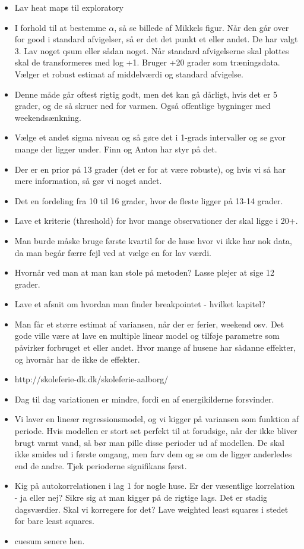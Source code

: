 \begin{itemize}
    \item Lav heat maps til exploratory
    \item I forhold til at bestemme $\alpha$, så se billede af Mikkels figur. Når den går over for good i standard afvigelser, så er det det punkt et eller andet. De har valgt 3. Lav noget qsum eller sådan noget. Når standard afvigelserne skal plottes skal de transformeres med log +1. Bruger +20 grader som træningsdata. Vælger et robust estimat af middelværdi og standard afvigelse. 
    \item Denne måde går oftest rigtig godt, men det kan gå dårligt, hvis det er 5 grader, og de så skruer ned for varmen. Også offentlige bygninger med weekendsænkning. 
    \item Vælge et andet sigma niveau og så gøre det i 1-grads intervaller og se gvor mange der ligger under. Finn og Anton har styr på det. 
    \item Der er en prior på 13 grader (det er for at være robuste), og hvis vi så har mere information, så gør vi noget andet. 
    \item Det en fordeling fra 10 til 16 grader, hvor de fleste ligger på 13-14 grader. 
    \item Lave et kriterie (threshold) for hvor mange observationer der skal ligge i 20+.  
    \item Man burde måske bruge første kvartil for de huse hvor vi ikke har nok data, da man begår færre fejl ved at vælge en for lav værdi. 
    \item Hvornår ved man at man kan stole på metoden? Lasse plejer at sige 12 grader. 
    \item Lave et afsnit om hvordan man finder breakpointet - hvilket kapitel? 
    \item Man får et større estimat af variansen, når der er ferier, weekend osv. Det gode ville være at lave en multiple linear model og tilføje parametre som påvirker forbruget et eller andet. Hvor mange af husene har sådanne effekter, og hvornår har de ikke de effekter. 
    \item http://skoleferie-dk.dk/skoleferie-aalborg/
    \item Dag til dag variationen er mindre, fordi en af energikilderne forsvinder. 
    \item Vi laver en lineær regressionsmodel, og vi kigger på variansen som funktion af periode. Hvis modellen er stort set perfekt til at forudsige, når der ikke bliver brugt varmt vand, så bør man pille disse perioder ud af modellen. De skal ikke smides ud i første omgang, men farv dem og se om de ligger anderledes end de andre. Tjek perioderne signifikans først. 
    \item Kig på autokorrelationen i lag 1 for nogle huse. Er der væsentlige korrelation - ja eller nej? Sikre sig at man kigger på de rigtige lags. Det er stadig dagsværdier. Skal vi korregere for det? Lave weighted least squares i stedet for bare least squares.
    \item cuesum senere hen. 
\end{itemize}


